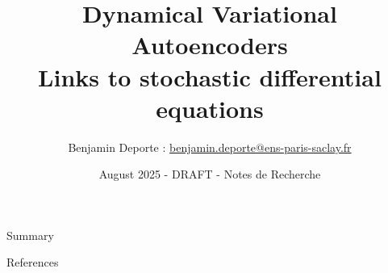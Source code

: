 \documentclass[8pt, aspectratio=169]{beamer}
\title{Dynamical Variational Autoencoders\\ Links to stochastic differential equations}
\author{
Benjamin Deporte : \href{mailto:benjamin.deporte@ens-paris-saclay.fr}{benjamin.deporte@ens-paris-saclay.fr}%
}
\date{August 2025 - DRAFT - Notes de Recherche}
\begin{document}
\maketitle

\begin{frame}{Summary}
    \tableofcontents
\end{frame}








\begin{frame}{References}
    \footnotesize
    \nocite{*}
    \printbibliography[heading=none]
\end{frame}


% 

\begin{frame}
    \printglossary
\end{frame}
\end{document}
